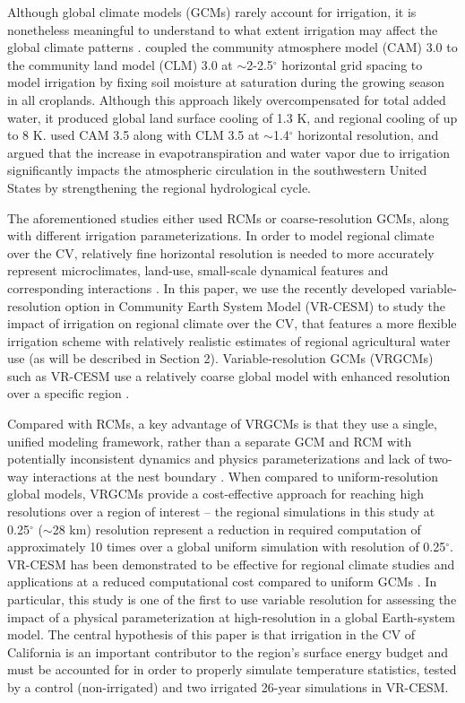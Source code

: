 Although global climate models (GCMs) rarely account for irrigation, it is nonetheless meaningful to understand to what extent irrigation may affect the global climate patterns \cite{sacks2009effects}. \cite{lobell2006biogeophysical} coupled the community atmosphere model (CAM) 3.0 to the community land model (CLM) 3.0 at $\sim$2-2.5$^\circ$ horizontal grid spacing to model irrigation by fixing soil moisture at saturation during the growing season in all croplands. Although this approach likely overcompensated for total added water, it produced global land surface cooling of 1.3 K, and regional cooling of up to 8 K. \cite{lo2013irrigation} used CAM 3.5 along with CLM 3.5 at $\sim$1.4$^\circ$ horizontal resolution, and argued that the increase in evapotranspiration and water vapor due to irrigation significantly impacts the atmospheric circulation in the southwestern United States by strengthening the regional hydrological cycle.

The aforementioned studies either used RCMs or coarse-resolution GCMs, along with different irrigation parameterizations. In order to model regional climate over the CV, relatively fine horizontal resolution is needed to more accurately represent microclimates, land-use, small-scale dynamical features and corresponding interactions \cite{leung2003regional, rauscher2010resolution}. In this paper, we use the recently developed variable-resolution option in Community Earth System Model (VR-CESM) to study the impact of irrigation on regional climate over the CV, that features a more flexible irrigation scheme with relatively realistic estimates of regional agricultural water use (as will be described in Section 2). Variable-resolution GCMs (VRGCMs) such as VR-CESM use a relatively coarse global model with enhanced resolution over a specific region \cite{staniforth1978variable, fox1997finite}. 


Compared with RCMs, a key advantage of VRGCMs is that they use a single, unified modeling framework, rather than a separate GCM and RCM with potentially inconsistent dynamics and physics parameterizations and lack of two-way interactions at the nest boundary \cite{laprise2008challenging}. When compared to uniform-resolution global models, VRGCMs provide a cost-effective approach for reaching high resolutions over a region of interest -- the regional simulations in this study at 0.25$^\circ$ ($\sim$28 km) resolution represent a reduction in required computation of approximately 10 times over a global uniform simulation with resolution of 0.25$^\circ$. VR-CESM has been demonstrated to be effective for regional climate studies and applications at a reduced computational cost compared to uniform GCMs \cite{zarzycki2015effects, rhoades2015characterizing, huang2016evaluation}. In particular, this study is one of the first to use variable resolution for assessing the impact of a physical parameterization at high-resolution in a global Earth-system model. The central hypothesis of this paper is that irrigation in the CV of California is an important contributor to the region's surface energy budget and must be accounted for in order to properly simulate temperature statistics, tested by a control (non-irrigated) and two irrigated 26-year simulations in VR-CESM.

